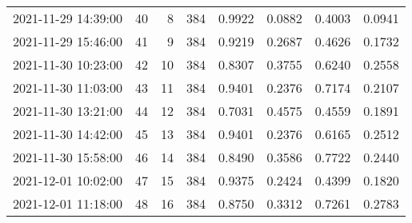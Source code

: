 \begin{table}
\begin{tabular}{lrrrrrrr}
2021-11-29 14:39:00 &   40 &    8 &    384 &   0.9922 & 0.0882 & 0.4003 & 0.0941 \\
2021-11-29 15:46:00 &   41 &    9 &    384 &   0.9219 & 0.2687 & 0.4626 & 0.1732 \\
2021-11-30 10:23:00 &   42 &   10 &    384 &   0.8307 & 0.3755 & 0.6240 & 0.2558 \\
2021-11-30 11:03:00 &   43 &   11 &    384 &   0.9401 & 0.2376 & 0.7174 & 0.2107 \\
2021-11-30 13:21:00 &   44 &   12 &    384 &   0.7031 & 0.4575 & 0.4559 & 0.1891 \\
2021-11-30 14:42:00 &   45 &   13 &    384 &   0.9401 & 0.2376 & 0.6165 & 0.2512 \\
2021-11-30 15:58:00 &   46 &   14 &    384 &   0.8490 & 0.3586 & 0.7722 & 0.2440 \\
2021-12-01 10:02:00 &   47 &   15 &    384 &   0.9375 & 0.2424 & 0.4399 & 0.1820 \\
2021-12-01 11:18:00 &   48 &   16 &    384 &   0.8750 & 0.3312 & 0.7261 & 0.2783 \\
\bottomrule
\end{tabular}
\end{table}
